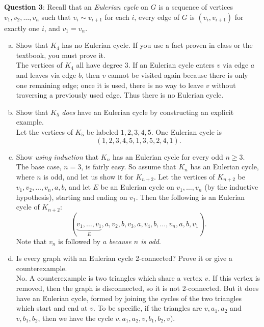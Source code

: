 \documentclass{amsart}
\begin{document}
	
	\newpage \textbf{Question 3}: Recall that an \textit{Eulerian cycle} on $G$ is a sequence of vertices $v_1,v_2,\dots,v_n$ such that $v_i\sim v_{i+1}$ for each $i$, every edge of $G$ is $(v_i,v_{i+1})$ for exactly one $i$, and $v_1=v_n$.
	
	\begin{enumerate}[(a)]
		\item Show that $K_4$ has no Eulerian cycle. If you use a fact proven in class or the textbook, you must prove it. \\
		
		The vertices of $K_4$ all have degree 3. If an Eulerian cycle enters $v$ via edge $a$ and leaves via edge $b$, then $v$ cannot be visited again because there is only one remaining edge; once it is used, there is no way to leave $v$ without traversing a previously used edge. Thus there is no Eulerian cycle.
		\vspace{60px}
		
		\item Show that $K_5$ \textit{does} have an Eulerian cycle by constructing an explicit example. \\
		
		Let the vertices of $K_5$ be labeled $1,2,3,4,5$. One Eulerian cycle is
		$$
		(1,2,3,4,5,1,3,5,2,4,1).
		$$
		\vspace{60px}
		
		\item Show \textit{using induction} that $K_n$ has an Eulerian cycle for every odd $n\geq 3$.\\
		
		The base case, $n=3$, is fairly easy. So assume that $K_n$ has an Eulerian cycle, where $n$ is odd, and let us show it for $K_{n+2}$. Let the vertices of $K_{n+2}$ be $v_1,v_2,\dots,v_n,a,b$, and let $E$ be an Eulerian cycle on $v_1,\dots,v_n$ (by the inductive hypothesis), starting and ending on $v_1$. Then the following is an Eulerian cycle of $K_{n+2}$:
		$$
		(\underbrace{v_1, \dots, v_1}_{E}, a, v_2, b, v_3, a, v_4, b, \dots , v_n, a, b, v_1).
		$$
		Note that $v_n$ is followed by $a$ \textit{because $n$ is odd}.
		
		\vspace{50px}
		
		\item Is every graph with an Eulerian cycle 2-connected? Prove it or give a counterexample.\\
		
		No. A counterexample is two triangles which share a vertex $v$. If this vertex is removed, then the graph is disconnected, so it is not 2-connected. But it does have an Eulerian cycle, formed by joining the cycles of the two triangles which start and end at $v$. To be specific, if the triangles are $v,a_1,a_2$ and $v,b_1,b_2$, then we have the cycle $v,a_1,a_2,v,b_1,b_2,v)$.
	\end{enumerate}
\end{document}
